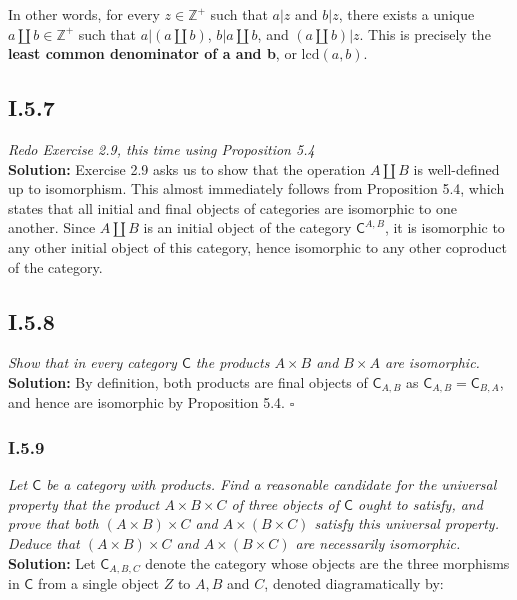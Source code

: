 \documentclass[11pt,a4paper]{article}
\begin{document}
\noindent In other words, for every $z \in \mathbb{Z}^+$ such that $a|z$ and $b|z$, there exists a unique $a \amalg b \in \mathbb{Z}^+$ such that $a|(a \amalg b)$, $b|a \amalg b$, and $(a \amalg b)|z$.  This is precisely the \textbf{least common denominator of a and b}, or $\text{lcd}(a,b)$.

\subsection*{I.5.7} \textit{Redo Exercise 2.9, this time using Proposition 5.4}\\

\noindent \textbf{Solution: }Exercise 2.9 asks us to show that the operation $A \amalg B$ is well-defined up to isomorphism.  This almost immediately follows from Proposition 5.4, which states that all initial and final objects of categories are isomorphic to one another.  Since $A \amalg B$ is an initial object of the category $\textsf{C}^{A,B}$, it is isomorphic to any other initial object of this category, hence isomorphic to any other coproduct of the category.

\subsection*{I.5.8} \textit{Show that in every category $\textsf{C}$ the products $A \times B$ and $B \times A$ are isomorphic.}\\

\noindent \textbf{Solution: } By definition, both products are final objects of $\textsf{C}_{A,B}$ as $\textsf{C}_{A,B} = \textsf{C}_{B,A}$, and hence are isomorphic by Proposition 5.4. $\square$

\subsubsection*{I.5.9} \textit{Let $\textsf{C}$ be a category with products.  Find a reasonable candidate for the universal property that the product $A \times B \times C$ of three objects of $\textsf{C}$ ought to satisfy, and prove that both $(A \times B) \times C$ and $A \times (B \times C)$ satisfy this universal property.  Deduce that $(A \times B) \times C$ and $A \times (B \times C)$ are necessarily isomorphic.} \\

\noindent \textbf{Solution: } Let $\textsf{C}_{A,B,C}$ denote the category whose objects are the three morphisms in $\textsf{C}$ from a single object $Z$ to $A,B$ and $C$, denoted diagramatically by:
\end{document}
